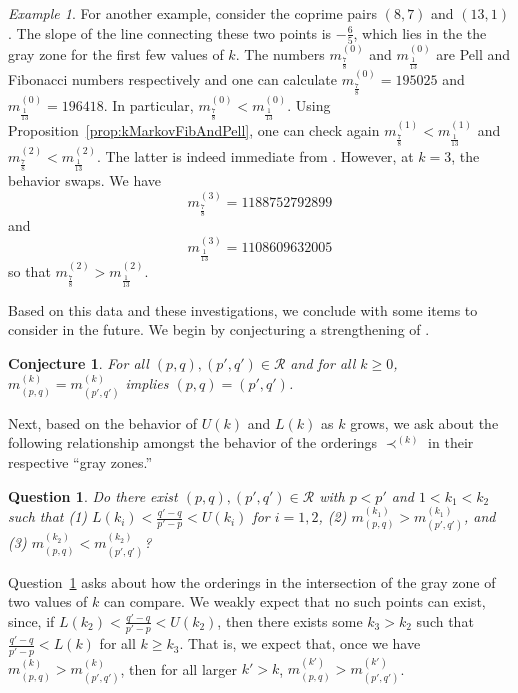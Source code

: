 \documentclass{article}
\newtheorem{conjecture}[theorem]{Conjecture}
\newtheorem{quest}[theorem]{Question}
\theoremstyle{remark}
\newtheorem{example}[theorem]{Example}
\begin{document}
\begin{example}
For another example, consider the coprime pairs $(8,7)$ and $(13,1)$.  The slope of the line connecting these two points is $-\frac65$, which lies in the the gray zone for the first few values of $k$. The numbers $m^{(0)}_{\frac78}$ and $m^{(0)}_{\frac{1}{13}}$ are Pell and Fibonacci numbers respectively and one can calculate $m^{(0)}_{\frac78} = 195025$ and $m^{(0)}_{\frac{1}{13}} = 196418$. In particular, $m^{(0)}_{\frac78} < m^{(0)}_{\frac{1}{13}}$. Using Proposition~\ref{prop:kMarkovFibAndPell}, one can check again $m^{(1)}_{\frac78} < m^{(1)}_{\frac{1}{13}}$ and $m^{(2)}_{\frac78} < m^{(2)}_{\frac{1}{13}}$. The latter is indeed immediate from \cite[Theorem 2.9]{gyoda2023uniqueness}. However, at $k = 3$, the behavior swaps. We have \[
m^{(3)}_{\frac78} = 1188752792899
\]
and
\[
m^{(3)}_{\frac{1}{13}} = 1108609632005
\]
so that $m^{(2)}_{\frac78} > m^{(2)}_{\frac{1}{13}}$.
\end{example}

Based on this data and these investigations, we conclude with some items to consider in the future. We begin by conjecturing a strengthening of \cite[Conjecture 1.8] {gyoda2023uniqueness}.

\begin{conjecture}
 For all $(p,q),(p',q') \in \mathcal{R}$ and for all $k \geq 0$, $m^{(k)}_{(p,q)} = m^{(k)}_{(p',q')}$ implies $(p,q)=(p',q')$.   
\end{conjecture}

Next, based on the behavior of $U(k)$ and $L(k)$ as $k$ grows, we ask about the following relationship amongst the behavior of the orderings $\prec^{(k)}$ in their respective ``gray zones.''

\begin{quest}\label{quest:OrderingRelationship}
Do there exist $(p,q),(p',q') \in \mathcal{R}$ with $p<p'$ and $1 < k_1 < k_2$ such that (1) $L(k_i) < \frac{q'-q}{p'-p} < U(k_i)$ for $i = 1,2$, (2) $m^{(k_1)}_{(p,q)} > m^{(k_1)}_{(p',q')}$, and (3) $m^{(k_2)}_{(p,q)} < m^{(k_2)}_{(p',q')}$?
\end{quest}

 Question~\ref{quest:OrderingRelationship} asks about how the orderings in the intersection of the gray zone of two values of $k$ can compare. We weakly expect that no such points can exist, since, if $L(k_2) < \frac{q'-q}{p'-p} < U(k_2)$, then there exists some $k_3 > k_2$ such that $ \frac{q'-q}{p'-p}  < L(k)$ for all $k \geq k_3$. That is, we expect that, once we have $m^{(k)}_{(p,q)} > m^{(k)}_{(p',q')}$, then for all larger $k' > k$, $m^{(k')}_{(p,q)} > m^{(k')}_{(p',q')}$. 




\end{document}
